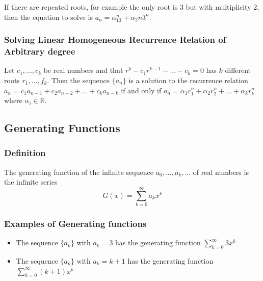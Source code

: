 \documentclass{article}
\begin{document}
\begin{tcolorbox}[width=12.1cm, leftrule=3mm]
If there are repeated roots, for example the only root is 3 but with multiplicity 2, then the equation to solve is $ a_n = \alpha_13^n + \alpha_{2}n3^n $.
\end{tcolorbox}

\subsubsection{Solving Linear Homogeneous Recurrence Relation of Arbitrary degree} Let $ c_1,...,c_k $ be real numbers and that $ r^k - c_1r^{k-1} - ... - c_k = 0 $ has $ k $ different roots $ r_1,...,f_k $. Then the sequence $ \{a_n\} $ is a solution to the recurrence relation $ a_n = c_1a_{n-1} + c_2a_{n-2} + ... + c_ka_{n-k} $ if and only if $ a_n = \alpha_1r_{1}^n + \alpha_2r_{2}^n + ... + \alpha_kr_{k}^n $ where $ \alpha_i \in \mathbb{R} $.

\subsection{Generating Functions}
\subsubsection{Definition} The generating function of the infinite sequence $ a_0,...,a_k,... $ of real numbers is the infinite series
\begin{equation}
G(x) = \sum_{k=0}^{\infty} a_kx^k
\end{equation}

\subsubsection{Examples of Generating functions}
\begin{itemize}
\item The sequence $ \{a_k\} $ with $ a_k = 3 $ has the generating function $ \sum_{k=0}^{\infty} 3x^k $
\item The sequence $ \{a_k\} $ with $ a_k = k + 1 $ has the generating function $ \sum_{k=0}^{\infty} (k + 1)x^k $
\end{itemize}
\end{document}
